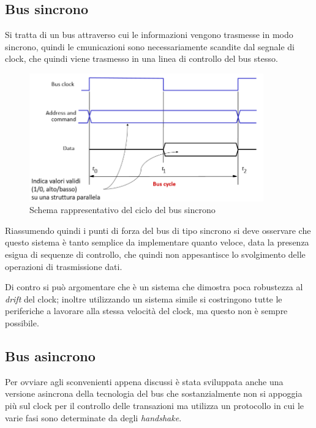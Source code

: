 \documentclass[class=book, crop=false, oneside]{standalone}
\begin{document}
\subsection{Bus sincrono}
Si tratta di un bus attraverso cui le informazioni vengono trasmesse in modo sincrono, quindi le cmunicazioni sono necessariamente scandite dal segnale di clock, che quindi viene trasmesso in una linea di controllo del bus stesso.

\begin{figure}[H]
	\centering
	\includegraphics[width=0.9\textwidth,keepaspectratio]{bus-sincrono}
	\caption{Schema rappresentativo del ciclo del bus sincrono}
\end{figure}

Riassumendo quindi i punti di forza del bus di tipo sincrono si deve osservare che questo sistema è tanto semplice da implementare quanto veloce, data la presenza esigua di sequenze di controllo, che quindi non appesantisce lo svolgimento delle operazioni di trasmissione dati.

Di contro si può argomentare che è un sistema che dimostra poca robustezza al \emph{drift} del clock; inoltre utilizzando un sistema simile si costringono tutte le periferiche a lavorare alla stessa velocità del clock, ma questo non è sempre possibile.

\subsection{Bus asincrono}
Per ovviare agli sconvenienti appena discussi è stata sviluppata anche una versione asincrona della tecnologia del bus che sostanzialmente non si appoggia più sul clock per il controllo delle transazioni ma utilizza un protocollo in cui le varie fasi sono determinate da degli \emph{handshake}.
\end{document}
